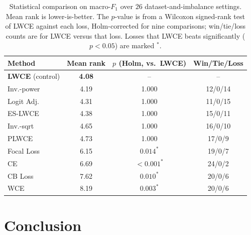 \documentclass[a4paper,fleqn]{cas-sc}
\begin{document}
\begin{table}[pos=h]
\centering
\caption{Statistical comparison on macro-$F_1$ over $26$ dataset-and-imbalance
settings. Mean rank is lower-is-better. The $p$-value is from a Wilcoxon
signed-rank test of LWCE against each loss, Holm-corrected for nine comparisons;
win/tie/loss counts are for LWCE versus that loss. Losses that LWCE beats
significantly ($p<0.05$) are marked $^{\ast}$.}
\label{tab:stats}
\begin{tabular}{lccc}
\toprule
Method & Mean rank & $p$ (Holm, vs.\ LWCE) & Win/Tie/Loss \\
\midrule
\textbf{LWCE} (control) & \textbf{4.08} & --      & -- \\
Inv.-power              & 4.19 & 1.000            & 12/0/14 \\
Logit Adj.              & 4.31 & 1.000            & 11/0/15 \\
ES-LWCE                 & 4.38 & 1.000            & 15/0/11 \\
Inv.-sqrt               & 4.65 & 1.000            & 16/0/10 \\
PLWCE                   & 4.73 & 1.000            & 17/0/9 \\
Focal Loss              & 6.15 & $0.014^{\ast}$   & 19/0/7 \\
CE                      & 6.69 & $<0.001^{\ast}$  & 24/0/2 \\
CB Loss                 & 7.62 & $0.010^{\ast}$   & 20/0/6 \\
WCE                     & 8.19 & $0.003^{\ast}$   & 20/0/6 \\
\bottomrule
\end{tabular}
\end{table}


\section{Conclusion}\label{sec:conclusion}

\printcredits



\end{document}
